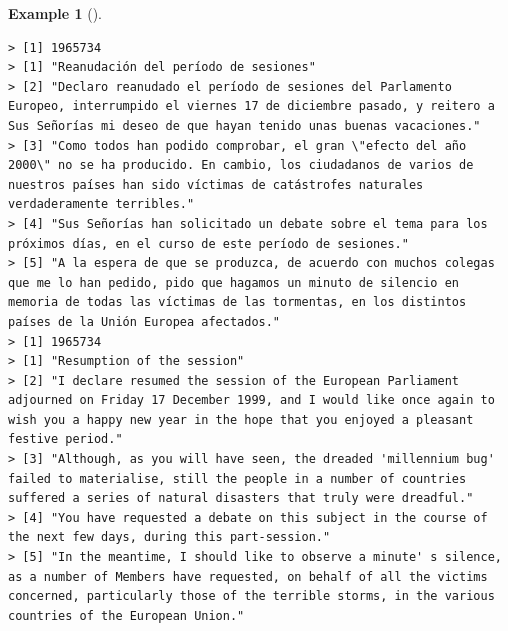 \documentclass[
  letterpaper,
  DIV=11,
  numbers=noendperiod]{scrreprt}
\theoremstyle{definition}
\newtheorem{example}{Example}[chapter]
\theoremstyle{remark}
\begin{document}
\begin{example}[]
\begin{verbatim}
> [1] 1965734
> [1] "Reanudación del período de sesiones"                                                                                                                                                                                                 
> [2] "Declaro reanudado el período de sesiones del Parlamento Europeo, interrumpido el viernes 17 de diciembre pasado, y reitero a Sus Señorías mi deseo de que hayan tenido unas buenas vacaciones."                                      
> [3] "Como todos han podido comprobar, el gran \"efecto del año 2000\" no se ha producido. En cambio, los ciudadanos de varios de nuestros países han sido víctimas de catástrofes naturales verdaderamente terribles."                    
> [4] "Sus Señorías han solicitado un debate sobre el tema para los próximos días, en el curso de este período de sesiones."                                                                                                                
> [5] "A la espera de que se produzca, de acuerdo con muchos colegas que me lo han pedido, pido que hagamos un minuto de silencio en memoria de todas las víctimas de las tormentas, en los distintos países de la Unión Europea afectados."
> [1] 1965734
> [1] "Resumption of the session"                                                                                                                                                                                                               
> [2] "I declare resumed the session of the European Parliament adjourned on Friday 17 December 1999, and I would like once again to wish you a happy new year in the hope that you enjoyed a pleasant festive period."                         
> [3] "Although, as you will have seen, the dreaded 'millennium bug' failed to materialise, still the people in a number of countries suffered a series of natural disasters that truly were dreadful."                                         
> [4] "You have requested a debate on this subject in the course of the next few days, during this part-session."                                                                                                                               
> [5] "In the meantime, I should like to observe a minute' s silence, as a number of Members have requested, on behalf of all the victims concerned, particularly those of the terrible storms, in the various countries of the European Union."
\end{verbatim}

\end{example}
\end{document}
